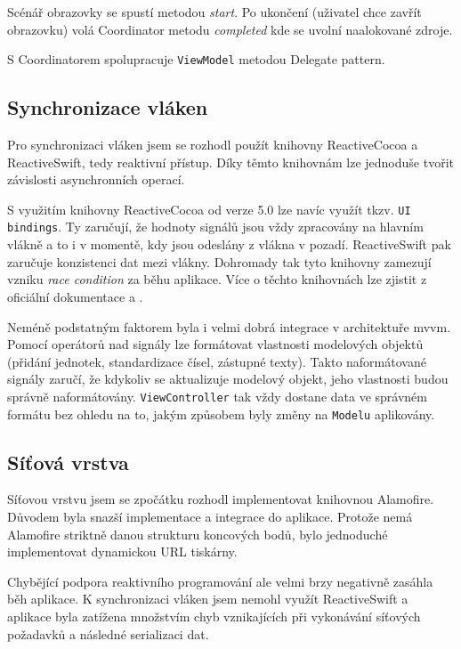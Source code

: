 Scénář obrazovky se spustí metodou \textit{start}.
Po ukončení (uživatel chce zavřít obrazovku) volá Coordinator metodu \textit{completed} kde se uvolní naalokované zdroje.

S Coordinatorem spolupracuje \texttt{ViewModel} metodou Delegate pattern.

\subsection{Synchronizace vláken}

Pro synchronizaci vláken jsem se rozhodl použít knihovny ReactiveCocoa a ReactiveSwift, tedy reaktivní přístup.
Díky těmto knihovnám lze jednoduše tvořit závislosti asynchronních operací.

S využitím knihovny ReactiveCocoa od verze 5.0 lze navíc využít tkzv. \texttt{UI bindings}.
Ty zaručují, že hodnoty signálů jsou vždy zpracovány na hlavním vlákně a to i v momentě, kdy jsou odeslány z vlákna v pozadí.
ReactiveSwift pak zaručuje konzistenci dat mezi vlákny.
Dohromady tak tyto knihovny zamezují vzniku \textit{race condition} za běhu aplikace.
Více o těchto knihovnách lze zjistit z oficiální dokumentace \cite{github-reactiveswift} a \cite{github-reactivecocoa}.

Neméně podstatným faktorem byla i velmi dobrá integrace v architektuře \acrshort{mvvm}.
Pomocí operátorů nad signály lze formátovat vlastnosti modelových objektů (přidání jednotek, standardizace čísel, zástupné texty).
Takto naformátované signály zaručí, že kdykoliv se aktualizuje modelový objekt, jeho vlastnosti budou správně naformátovány.
\texttt{ViewController} tak vždy dostane data ve správném formátu bez ohledu na to, jakým způsobem byly změny na \texttt{Modelu} aplikovány.

\subsection{Síťová vrstva}

Síťovou vrstvu jsem se zpočátku rozhodl implementovat knihovnou Alamofire.
Důvodem byla snazší implementace a integrace do aplikace.
Protože nemá Alamofire striktně danou strukturu koncových bodů, bylo jednoduché implementovat dynamickou URL tiskárny.

Chybějící podpora reaktivního programování ale velmi brzy negativně zasáhla běh aplikace.
K synchronizaci vláken jsem nemohl využít ReactiveSwift a aplikace byla zatížena množstvím chyb vznikajících při vykonávání síťových požadavků a následné serializaci dat.

